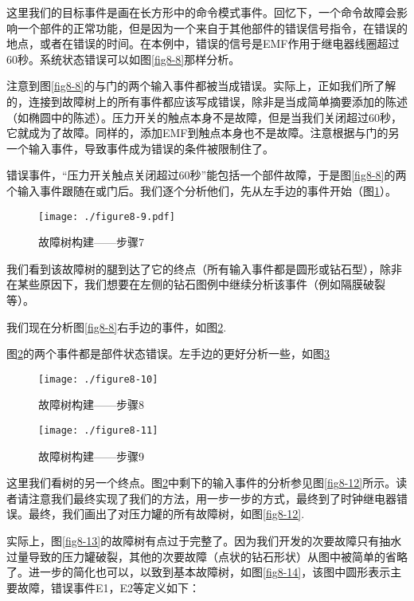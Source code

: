 \documentclass[cn,11pt,chinese]{elegantbook}
\begin{document}
{这里我们的目标事件是画在长方形中的命令模式事件。回忆下，一个命令故障会影响一个部件的正常功能，但是因为一个来自于其他部件的错误信号指令，在错误的地点，或者在错误的时间。在本例中，错误的信号是EMF作用于继电器线圈超过60秒。系统状态错误可以如图\ref{fig8-8}那样分析。

注意到图\ref{fig8-8}的与门的两个输入事件都被当成错误。实际上，正如我们所了解的，连接到故障树上的所有事件都应该写成错误，除非是当成简单摘要添加的陈述（如椭圆中的陈述）。压力开关的触点本身不是故障，但是当我们关闭超过60秒，它就成为了故障。同样的，添加EMF到触点本身也不是故障。注意根据与门的另一个输入事件，导致事件成为错误的条件被限制住了。

错误事件，“压力开关触点关闭超过60秒”能包括一个部件故障，于是图\ref{fig8-8}的两个输入事件跟随在或门后。我们逐个分析他们，先从左手边的事件开始（图\ref{fig8-9}）。

\begin{figure}[H]
	\centering
	\texttt{[image: ./figure8-9.pdf]}
	\caption{故障树构建——步骤7}
	\label{fig8-9}
\end{figure}

我们看到该故障树的腿到达了它的终点（所有输入事件都是圆形或钻石型），除非在某些原因下，我们想要在左侧的钻石图例中继续分析该事件（例如隔膜破裂等）。

我们现在分析图\ref{fig8-8}右手边的事件，如图\ref{fig8-10}.

图\ref{fig8-10}的两个事件都是部件状态错误。左手边的更好分析一些，如图\ref{fig8-11}

\begin{figure}[H]
	\centering
	\texttt{[image: ./figure8-10]}
	\caption{故障树构建——步骤8}
	\label{fig8-10}
\end{figure}

\begin{figure}[H]
	\centering
	\texttt{[image: ./figure8-11]}
	\caption{故障树构建——步骤9}
	\label{fig8-11}
\end{figure}

这里我们看树的另一个终点。图\ref{fig8-10}中剩下的输入事件的分析参见图\ref{fig8-12}所示。读者请注意我们最终实现了我们的方法，用一步一步的方式，最终到了时钟继电器错误。最终，我们画出了对压力罐的所有故障树，如图\ref{fig8-12}.

实际上，图\ref{fig8-13}的故障树有点过于完整了。因为我们开发的次要故障只有抽水过量导致的压力罐破裂，其他的次要故障（点状的钻石形状）从图中被简单的省略了。进一步的简化也可以，以致到基本故障树，如图\ref{fig8-14}，该图中圆形表示主要故障，错误事件E1，E2等定义如下：

}
\end{document}

